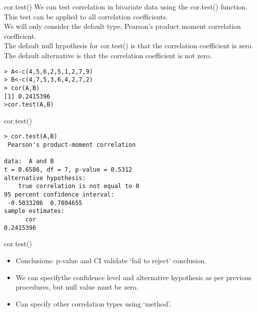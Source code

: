\documentclass[pdf,default,slideColor,colorBG]{prosper}
\begin{document}
\begin{slide}{cor.test() }
We can test correlation in bivariate data using the cor.test() function.
This test can be applied to all correlation coefficients.\\ We will only consider the default type, Pearson's product moment correlation coefficient.\\
The default null hypothesis for cor.test() is that the correlation coefficient is zero.
The default alternative is that the correlation coefficient is not zero.
\begin{verbatim}
> A<-c(4,5,6,2,5,1,2,7,9)
> B<-c(4,7,5,3,6,4,2,7,2)
> cor(A,B)
[1] 0.2415396
>cor.test(A,B)
\end{verbatim}

\end{slide}
\begin{slide}{cor.test() }



\begin{verbatim}
> cor.test(A,B)
 Pearson's product-moment correlation

data:  A and B
t = 0.6586, df = 7, p-value = 0.5312
alternative hypothesis: 
    true correlation is not equal to 0
95 percent confidence interval:
 -0.5033206  0.7804655
sample estimates:
      cor
0.2415396
\end{verbatim}

\end{slide}
\begin{slide}{cor.test() }
\begin{itemize}
\item Conclusions: p-value and CI validate `fail to reject' conclusion.
\item We can specifythe confidence level and alternative hypothesis as per previous procedures, but null value must be zero.
\item Can specify other correlation types using `method'.
\end{itemize}

\end{slide}
\end{document}
